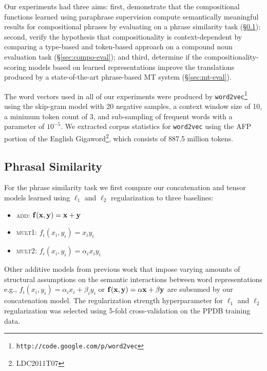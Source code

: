 \documentclass[11pt,letterpaper]{article}
\newcommand{\bX}{{\bf x}}
\newcommand{\bY}{{\bf y}}
\newcommand{\bF}{{\bf f}}
\begin{document}
Our experiments had three aims: first, demonstrate that the compositional functions learned using paraphrase supervision compute semantically meaningful results for compositional phrases by evaluating on a phrase similarity task (\S\ref{sec:phrasesim-eval}); second, verify the hypothesis that compositionality is context-dependent by comparing a type-based and token-based approach on a compound noun evaluation task (\S\ref{sec:compo-eval}); and third, determine if the compositionality-scoring models based on learned representations improve the translations produced by a state-of-the-art phrase-based MT system (\S\ref{sec:mt-eval}).  

The word vectors used in all of our experiments were produced by \texttt{word2vec}\footnote{\texttt{http://code.google.com/p/word2vec}} using the skip-gram model with 20 negative samples, a context window size of 10, a minimum token count of 3, and sub-sampling of frequent words with a parameter of $10^{-5}$.  
We extracted corpus statistics for \texttt{word2vec} using the AFP portion of the English Gigaword\footnote{LDC2011T07}, which consists of 887.5 million tokens. 

\subsection{Phrasal Similarity}
\label{sec:phrasesim-eval}

For the phrase similarity task we first compare our concatenation and tensor models learned using $\ell_1$ and $\ell_2$ regularization to three baselines:
\begin{itemize}[noitemsep]
	\item \textsc{add}: $\bF(\bX, \bY) = \bX + \bY$
	\item \textsc{mult1}: $f_i(x_i, y_i) = x_i y_i$
	\item \textsc{mult2}: $f_i(x_i, y_i) = \alpha_i x_i y_i$
\end{itemize}
Other additive models from previous work \cite{Mitchell2010,Zanzotto2010,Blacoe2012} that impose varying amounts of structural assumptions on the semantic interactions between word representations e.g., $f_i(x_i, y_i) = \alpha_i x_i + \beta_i y_i$ or $\bF(\bX, \bY) = \alpha\bX + \beta\bY$ are subsumed by our concatenation model. 
The regularization strength hyperparameter for $\ell_1$ and $\ell_2$ regularization was selected using 5-fold cross-validation on the PPDB training data. 
\end{document}
